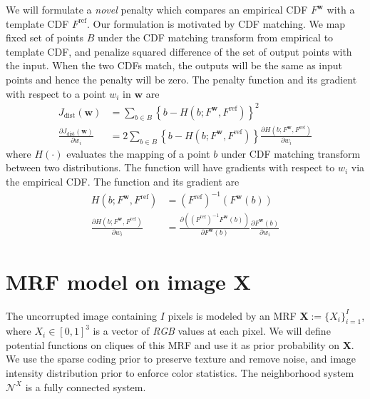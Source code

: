We will formulate a \emph{novel} penalty which compares an empirical CDF $F^\mathbf{w}$ with a template CDF $F^\text{ref}$. Our formulation is motivated by CDF matching. We map fixed set of points $B$ under the CDF matching transform from empirical to template CDF, and penalize squared difference of the set of output points with the input. When the two CDFs match, the outputs will be the same as input points and hence the penalty will be zero. The penalty function and its gradient with respect to a point $w_i$ in $\mathbf{w}$ are
\begin{align}
    J_\text{dist} (\mathbf{w}) &= \sum_{b \in B} \left\lbrace b - H \left( b; F^\mathbf{w}, F^\text{ref} \right) \right\rbrace^2 \label{eqn:kdecost} \\
    \frac{ \partial J_\text{dist} (\mathbf{w})} { \partial w_i} &= 2 \sum_{b \in B} \left\lbrace b - H \left( b; F^\mathbf{w}, F^\text{ref} \right) \right\rbrace \frac{\partial H \left( b; F^\mathbf{w}, F^\text{ref} \right)}{\partial w_i}
\end{align}
where $H \left( \cdot \right)$ evaluates the mapping of a point $b$ under CDF matching transform between two distributions. The function will have gradients with respect to $w_i$ via the empirical CDF. The function and its gradient are
\begin{align}
    H \left( b; F^\mathbf{w}, F^\text{ref} \right) &= \left( F^\text{ref}\right)^{-1} \left( F^\mathbf{w} \left(b \right) \right) \label{eqn:cdfinv} \\
    \frac{\partial H \left( b; F^\mathbf{w}, F^\text{ref} \right)}{\partial w_i} &= \frac{ \partial \left( \left( F^\text{ref}\right)^{-1} F^\mathbf{w} \left(b\right) \right) } { \partial F^\mathbf{w} \left( b \right) } \frac{ \partial F^\mathbf{w} \left( b \right)} { \partial w_i}
\end{align}

\section{MRF model on image $\mathbf{X}$}
\label{sec:modelX}

The uncorrupted image containing $I$ pixels is modeled by an MRF $\mathbf{X} := \lbrace X_i \rbrace_{i=1}^{I}$, where $X_i \in \left[0, 1\right]^3$ is a vector of \emph{RGB} values at each pixel. We will define potential functions on cliques of this MRF and use it as prior probability on $\mathbf{X}$. We use the sparse coding prior to preserve texture and remove noise, and image intensity distribution prior to enforce color statistics. The neighborhood system $\mathcal{N}^X$ is a fully connected system.

